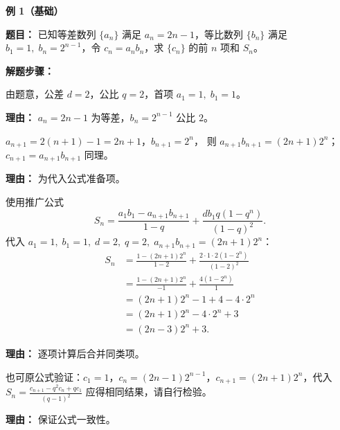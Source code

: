 \begin{examplebox}

\textbf{\textcolor{CExample}{例 1（基础）}}

\textbf{\textcolor{CExample}{题目：}} 已知等差数列 \(\{a_n\}\) 满足 \(a_n = 2n-1\)，等比数列 \(\{b_n\}\) 满足 \(b_1 = 1,\; b_n = 2^{n-1}\)，令 \(c_n = a_n b_n\)，求 \(\{c_n\}\) 的前 \(n\) 项和 \(S_n\)。

\textbf{\textcolor{CExample}{解题步骤：}}
\begin{description}[style=nextline, leftmargin=2.8em, labelsep=0.5em, itemsep=0.45em]
    \item[\textbf{第一步（识别参数）：}] 由题意，公差 \(d = 2\)，公比 \(q = 2\)，首项 \(a_1 = 1,\; b_1 = 1\)。
    \par\textbf{理由：} \(a_n = 2n-1\) 为等差，\(b_n = 2^{n-1}\) 公比 \(2\)。

    \item[\textbf{第二步（求所需项）：}]
    \(a_{n+1} = 2(n+1)-1 = 2n+1\)，\(b_{n+1} = 2^{n}\)，
    则 \(a_{n+1} b_{n+1} = (2n+1) 2^{n}\)；
    \(c_{n+1} = a_{n+1} b_{n+1}\) 同理。
    \par\textbf{理由：} 为代入公式准备项。

    \item[\textbf{第三步（代入公式）：}] 使用推广公式
    \[
    S_n = \frac{a_1 b_1 - a_{n+1} b_{n+1}}{1-q} + \frac{d b_1 q (1 - q^n)}{(1-q)^2}.
    \]
    代入 \(a_1=1,\; b_1=1,\; d=2,\; q=2,\; a_{n+1} b_{n+1}= (2n+1)2^n\)：
    \[
    \begin{aligned}
    S_n &= \frac{1 - (2n+1)2^n}{1-2} + \frac{2 \cdot 1 \cdot 2 (1 - 2^n)}{(1-2)^2}\\
        &= \frac{1 - (2n+1)2^n}{-1} + \frac{4 (1 - 2^n)}{1}\\
        &= (2n+1)2^n - 1 + 4 - 4 \cdot 2^n\\
        &= (2n+1)2^n - 4 \cdot 2^n + 3\\
        &= (2n-3)2^n + 3.
    \end{aligned}
    \]
    \par\textbf{理由：} 逐项计算后合并同类项。

    \item[\textbf{第四步（验证）：}] 也可原公式验证：\(c_1 = 1\)，\(c_n = (2n-1)2^{n-1}\)，\(c_{n+1} = (2n+1)2^n\)，代入 \(S_n = \frac{c_{n+1} - q^2 c_n + q c_1}{(q-1)^2}\) 应得相同结果，请自行检验。
    \par\textbf{理由：} 保证公式一致性。
\end{description}


\end{examplebox}
